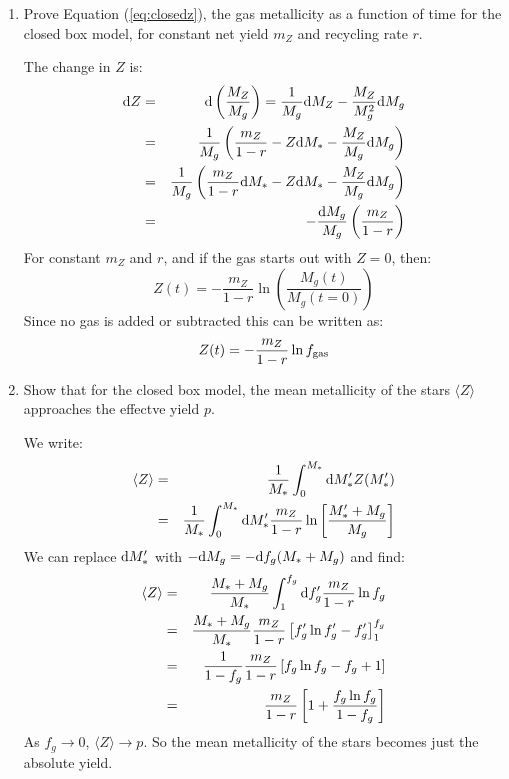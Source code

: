 \begin{enumerate}
\item Prove Equation (\ref{eq:closedz}), the gas metallicity as a
  function of time for the closed box model, for constant net yield
  $m_Z$ and recycling rate $r$.

\begin{answer}
The change in $Z$ is:
\begin{eqnarray}
  {\rm d}Z &=& {\rm d}\left(\frac{M_Z}{M_g}\right) =
  \frac{1}{M_g} {\rm d}M_Z - \frac{M_Z}{M_g^2} {\rm d}M_g \cr
&=& \frac{1}{M_g} \left(\frac{m_Z}{1-r}  - Z {\rm d}M_\ast -
  \frac{M_Z}{M_g} {\rm d}M_g\right) \cr
&=& \frac{1}{M_g} \left(\frac{m_Z}{1-r} {\rm d}M_\ast - Z {\rm d}M_\ast -
  \frac{M_Z}{M_g} {\rm d}M_g\right) \cr
&=& - \frac{{\rm d}M_g}{M_g} \left(\frac{m_Z}{1-r}\right)
\end{eqnarray}
For constant $m_Z$ and $r$, and if the gas starts out with $Z=0$,
then:
\begin{equation}
Z(t) = - \frac{m_Z}{1-r} \ln\left(\frac{M_g(t)}{M_g(t=0)}\right)
\end{equation}
Since no gas is added or subtracted this can be written as:
\begin{equation}
Z(t) = - \frac{m_Z}{1-r} \ln f_{\rm gas}
\end{equation}
\end{answer}

\item Show that for the closed box model, 
the mean metallicity of the stars $\langle Z\rangle$ approaches the
effectve yield $p$.

\begin{answer}
We write:
\begin{eqnarray}
  \langle Z\rangle &=&
  \frac{1}{M_\ast} \int_0^{M_\ast} {\rm d}M_\ast' Z(M_\ast') \cr
&=&
  \frac{1}{M_\ast} \int_0^{M_\ast} {\rm d}M_\ast' 
  \frac{m_Z}{1-r} \ln \left[\frac{M_\ast'+ M_g}{M_g}\right] 
\end{eqnarray}
We can replace ${\rm d}M_\ast'$ with $-{\rm d}M_g = - {\rm d}f_g
(M_\ast + M_g)$ and find:
\begin{eqnarray}
  \langle Z\rangle
  &=&
  \frac{M_\ast + M_g}{M_\ast} \int_1^{f_g} {\rm d}f_g'
  \frac{m_Z}{1-r} \ln f_g \cr
  &=&
  \frac{M_\ast + M_g}{M_\ast}
  \frac{m_Z}{1-r}
  \left[
    f_g' \ln f_g' - f_g'
    \right]_1^{f_g} \cr
  &=&
  \frac{1}{1-f_g}
  \frac{m_Z}{1-r}
  \left[
    f_g \ln f_g - f_g + 1
    \right] \cr
  &=&
  \frac{m_Z}{1-r}
  \left[
    1 + \frac{f_g \ln f_g}{1-f_g}
    \right]
\end{eqnarray}
As $f_g\rightarrow 0$, $\langle Z\rangle \rightarrow p$. So the mean
metallicity of the stars becomes just the absolute yield.
\end{answer}


\end{enumerate}
